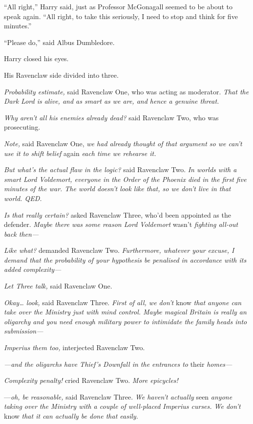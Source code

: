 ``All right,'' Harry said, just as Professor McGonagall seemed to be
about to speak again. ``All right, to take this seriously, I need to
stop and think for five minutes.''

``Please do,'' said Albus Dumbledore.

Harry closed his eyes.

His Ravenclaw side divided into three.

\emph{Probability estimate,} said Ravenclaw One, who was acting as
moderator. \emph{That the Dark Lord is alive, and as smart as we are,
and hence a genuine threat.}

\emph{Why aren't all his enemies already dead?} said Ravenclaw Two, who
was prosecuting.

\emph{Note,} said Ravenclaw One, \emph{we had already thought of that
argument so we can't use it to shift belief} again \emph{each time we
rehearse it.}

\emph{But what's the actual flaw in the logic?} said Ravenclaw Two.
\emph{In worlds with a smart Lord Voldemort, everyone in the Order of
the Phoenix died in the first five minutes of the war. The world doesn't
look like that, so we don't live in that world. QED.}

\emph{Is that really certain?} asked Ravenclaw Three, who'd been
appointed as the defender. \emph{Maybe there was some reason Lord
Voldemort} wasn't \emph{fighting all-out back then---}

\emph{Like what?} demanded Ravenclaw Two. \emph{Furthermore, whatever
your excuse, I demand that the probability of your hypothesis be
penalised in accordance with its added complexity---}

\emph{Let Three talk,} said Ravenclaw One.

\emph{Okay\ldots{} look,} said Ravenclaw Three. \emph{First of all, we
don't} know \emph{that anyone can take over the Ministry just with mind
control. Maybe magical Britain is really an oligarchy and you need
enough military power to intimidate the family heads into submission---}

\emph{Imperius them too,} interjected Ravenclaw Two.

\emph{---and the oligarchs have Thief's Downfall in the entrances to}
their \emph{homes---}

\emph{Complexity penalty!} cried Ravenclaw Two. \emph{More epicycles!}

---\emph{oh, be reasonable,} said Ravenclaw Three. \emph{We haven't
actually} seen \emph{anyone taking over the Ministry with a couple of
well-placed Imperius curses. We don't} know \emph{that it can actually
be done that easily.}

